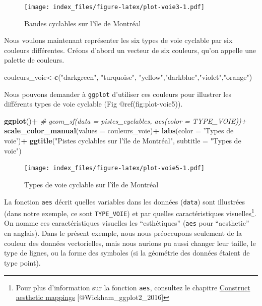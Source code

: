 \documentclass[]{article}
\newenvironment{Shaded}{\begin{snugshade}}{\end{snugshade}}
\newcommand{\KeywordTok}[1]{\textcolor[rgb]{0.13,0.29,0.53}{\textbf{#1}}}
\newcommand{\DataTypeTok}[1]{\textcolor[rgb]{0.13,0.29,0.53}{#1}}
\newcommand{\StringTok}[1]{\textcolor[rgb]{0.31,0.60,0.02}{#1}}
\newcommand{\CommentTok}[1]{\textcolor[rgb]{0.56,0.35,0.01}{\textit{#1}}}
\newcommand{\OperatorTok}[1]{\textcolor[rgb]{0.81,0.36,0.00}{\textbf{#1}}}
\newcommand{\NormalTok}[1]{#1}
\begin{document}
\begin{figure}
\centering
\texttt{[image: index\_files/figure-latex/plot-voie3-1.pdf]}
\caption{Bandes cyclables sur l'île de Montréal}
\end{figure}

Nous voulons maintenant représenter les six types de voie cyclable par
six couleurs différentes. Créons d'abord un vecteur de six couleurs,
qu'on appelle une palette de couleurs.

\begin{Shaded}
\begin{Highlighting}[]
\NormalTok{couleurs_voie<-}\KeywordTok{c}\NormalTok{(}\StringTok{"darkgreen"}\NormalTok{, }\StringTok{"turquoise"}\NormalTok{, }\StringTok{"yellow"}\NormalTok{,}\StringTok{"darkblue"}\NormalTok{,}\StringTok{"violet"}\NormalTok{,}\StringTok{"orange"}\NormalTok{)}
\end{Highlighting}
\end{Shaded}

Nous pouvons demander à \texttt{ggplot} d'utiliser ces couleurs pour
illustrer les différents types de voie cyclable (Fig
@ref(fig:plot-voie5)).

\begin{Shaded}
\begin{Highlighting}[]
\KeywordTok{ggplot}\NormalTok{()}\OperatorTok{+}
\StringTok{  }\CommentTok{# geom_sf(data = pistes_cyclables,  aes(color = TYPE_VOIE))+}
\StringTok{  }\KeywordTok{scale_color_manual}\NormalTok{(}\DataTypeTok{values =}\NormalTok{ couleurs_voie)}\OperatorTok{+}
\StringTok{  }\KeywordTok{labs}\NormalTok{(}\DataTypeTok{color =} \StringTok{'Types de voie'}\NormalTok{)}\OperatorTok{+}
\StringTok{  }\KeywordTok{ggtitle}\NormalTok{(}\StringTok{"Pistes cyclables sur l'île de Montréal"}\NormalTok{, }\DataTypeTok{subtitle =} \StringTok{"Types de voie"}\NormalTok{)}
\end{Highlighting}
\end{Shaded}

\begin{figure}
\centering
\texttt{[image: index\_files/figure-latex/plot-voie5-1.pdf]}
\caption{Types de voie cyclable sur l'île de Montréal}
\end{figure}

La fonction \texttt{aes} décrit quelles variables dans les données
(\texttt{data}) sont illustrées (dans notre exemple, ce sont
\texttt{TYPE\_VOIE}) et par quelles caractéristiques visuelles\footnote{Pour
  plus d'information sur la fonction \texttt{aes}, consultez le chapitre
  \href{https://ggplot2.tidyverse.org/reference/aes.html}{Construct
  aesthetic mappings} {[}@Wickham\_ggplot2\_2016{]}}. On nomme ces
caractéristiques visuelles les ``esthétiques'' (\texttt{aes} pour
``aesthetic'' en anglais). Dans le présent exemple, nous nous
préoccupons seulement de la couleur des données vectorielles, mais nous
aurions pu aussi changer leur taille, le type de lignes, ou la forme des
symboles (si la géométrie des données étaient de type point).
\end{document}
